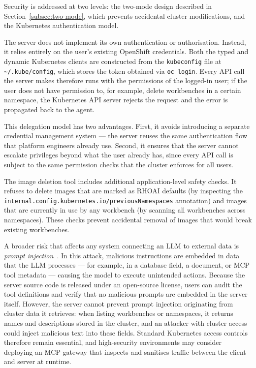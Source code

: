 \documentclass[
  digital,     %
  oneside,     %
  nosansbold,  %
  nocolorbold, %
  lof,         %
  lot,         %
]{fithesis4}
\begin{document}
Security is addressed at two levels: the two-mode design described in
Section~\ref{subsec:two-mode}, which prevents accidental cluster
modifications, and the Kubernetes authentication model.

The server does not implement its own authentication or authorisation.
Instead, it relies entirely on the user's existing OpenShift credentials.
Both the typed and dynamic Kubernetes clients are constructed from the
\texttt{kubeconfig} file at \texttt{\textasciitilde/.kube/config}, which
stores the token obtained via \texttt{oc login}. Every API call the server
makes therefore runs with the permissions of the logged-in user; if the user
does not have permission to, for example, delete workbenches in a certain
namespace, the Kubernetes API server rejects the request and the error is
propagated back to the agent.

This delegation model has two advantages. First, it avoids introducing a
separate credential management system --- the server reuses the same
authentication flow that platform engineers already use. Second, it ensures
that the server cannot escalate privileges beyond what the user already has,
since every API call is subject to the same permission checks that the
cluster enforces for all users.

The image deletion tool includes additional application-level safety checks. It
refuses to delete images that are marked as RHOAI defaults (by inspecting
the \texttt{internal.config.kubernetes.io/\allowbreak previousNamespaces} annotation)
and images that are currently in use by any workbench (by scanning all
workbenches across namespaces). These checks prevent accidental removal of
images that would break existing workbenches.

A broader risk that affects any system connecting an LLM to external data
is \textit{prompt injection}~\parencite{greshake2023indirect}. In this
attack, malicious instructions are embedded in data that the LLM
processes --- for example, in a database field, a document, or MCP tool
metadata --- causing the model to execute unintended actions. Because
the server source code is released under an open-source license, users
can audit the tool definitions and verify that no malicious prompts are
embedded in the server itself. However, the server cannot prevent
prompt injection originating from cluster data it retrieves: when
listing workbenches or namespaces, it returns names and descriptions
stored in the cluster, and an attacker with cluster access could inject
malicious text into these fields. Standard Kubernetes access controls
therefore remain essential, and high-security environments may consider
deploying an MCP gateway that inspects and sanitises traffic between
the client and server at runtime.
\end{document}
